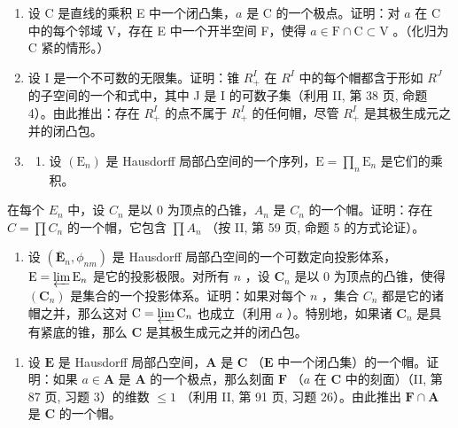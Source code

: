 \begin{enumerate}
\def\labelenumi{\arabic{enumi})}
\setcounter{enumi}{26}
\item
  设 C 是直线的乘积 E 中一个闭凸集，\(a\) 是 C 的一个极点。证明：对 \(a\) 在 C 中的每个邻域 V，存在 E 中一个开半空间 F，使得 \(a \in \mathrm{F} \cap \mathrm{C} \subset \mathrm{V}\) 。（化归为 C 紧的情形。）
\item
  设 I 是一个不可数的无限集。证明：锥 \(R_{+}^{I}\) 在 \(R^{I}\) 中的每个帽都含于形如 \(R^{J}\) 的子空间的一个和式中，其中 J 是 I 的可数子集（利用 II, 第 38 页, 命题 4）。由此推出：存在 \(R_{+}^{I}\) 的点不属于 \(R_{+}^{I}\) 的任何帽，尽管 \(R_{+}^{I}\) 是其极生成元之并的闭凸包。
\item
  \begin{enumerate}
  \def\labelenumii{\alph{enumii})}
  \tightlist
  \item
    设 \((\mathrm{E}_n)\) 是 Hausdorff 局部凸空间的一个序列，\(\mathrm{E} = \prod_{n}\mathrm{E}_{n}\) 是它们的乘积。
  \end{enumerate}
\end{enumerate}

在每个 \(E_{n}\) 中，设 \(C_{n}\) 是以 0 为顶点的凸锥，\(A_{n}\) 是 \(C_{n}\) 的一个帽。证明：存在 \(C = \prod C_{n}\) 的一个帽，它包含 \(\prod A_{n}\) （按 II, 第 59 页, 命题 5 的方式论证）。

\begin{enumerate}
\def\labelenumi{\alph{enumi})}
\setcounter{enumi}{1}
\tightlist
\item
  设 \((\overline{\mathbf{E}}_n, \phi_{nm})\) 是 Hausdorff 局部凸空间的一个可数定向投影体系，\(\mathrm{E} = \varprojlim \mathrm{E}_n\) 是它的投影极限。对所有 \(n\) ，设 \(\mathbf{C}_n\) 是以 0 为顶点的凸锥，使得 \((\mathbf{C}_n)\) 是集合的一个投影体系。证明：如果对每个 \(n\) ，集合 \(C_n\) 都是它的诸帽之并，那么这对 \(\mathrm{C} = \varprojlim \mathrm{C}_n\) 也成立（利用 \(a\) ）。特别地，如果诸 \(\mathbf{C}_n\) 是具有紧底的锥，那么 \(\mathbf{C}\) 是其极生成元之并的闭凸包。
\end{enumerate}

\begin{enumerate}
\def\labelenumi{\arabic{enumi})}
\setcounter{enumi}{29}
\tightlist
\item
  设 \(\mathbf{E}\) 是 Hausdorff 局部凸空间，\(\mathbf{A}\) 是 \(\mathbf{C}\) （\(\mathbf{E}\) 中一个闭凸集）的一个帽。证明：如果 \(a \in \mathbf{A}\) 是 \(\mathbf{A}\) 的一个极点，那么刻面 \(\mathbf{F}\) （\(a\) 在 \(\mathbf{C}\) 中的刻面）（II, 第 87 页, 习题 3）的维数 \(\leqslant 1\) （利用 II, 第 91 页, 习题 26）。由此推出 \(\mathbf{F} \cap \mathbf{A}\) 是 \(\mathbf{C}\) 的一个帽。
\end{enumerate}


